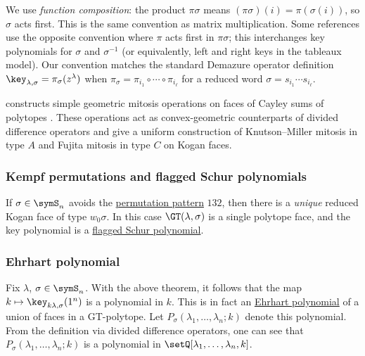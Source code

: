 \begin{remark}
We use \emph{function composition}: the product $\pi\sigma$ means
$(\pi\sigma)(i) = \pi(\sigma(i))$, so $\sigma$ acts first.
This is the same convention as matrix multiplication.
Some references use the opposite convention where $\pi$ acts first in $\pi\sigma$;
this interchanges key polynomials for $\sigma$ and $\sigma^{-1}$
(or equivalently, left and right keys in the tableaux model).
Our convention matches the standard Demazure operator definition
$\key_{\lambda,\sigma} = \pi_\sigma(z^\lambda)$
when $\pi_\sigma = \pi_{i_1} \circ \dotsb \circ \pi_{i_\ell}$
for a reduced word $\sigma = s_{i_1} \dotsm s_{i_\ell}$.
\end{remark}

 constructs simple geometric mitosis operations on
faces of Cayley sums of polytopes \cite{Kiritchenko2025}.  These operations
act as convex-geometric counterparts of divided difference operators and give
a uniform construction of Knutson--Miller mitosis in type $A$ and Fujita
mitosis in type $C$ on Kogan faces.


\subsubsection[keyKempf]{Kempf permutations and flagged Schur polynomials}

\begin{proposition}\label{prop:kempfCase}
If $\sigma \in \symS_n$ avoids the \hyperref[permutationPattern]{permutation pattern} $132$,
then there is a \emph{unique} reduced Kogan face of type $w_0 \sigma$.
In this case $\GT(\lambda, \sigma)$ is a single polytope face,
and the key polynomial is a \hyperref[schurFlagged]{flagged Schur polynomial}.
\end{proposition}


\subsubsection[keyEhrhart]{Ehrhart polynomial}

Fix $\lambda$, $\sigma \in \symS_n$.
With the above theorem, it follows that the map $k \mapsto \key_{k \lambda,\sigma}(1^n)$
is a polynomial in $k$.
This is in fact an \hyperref[ehrhart]{Ehrhart polynomial} of a union of faces
in a GT-polytope.
Let $P_{\sigma}(\lambda_1,\dotsc,\lambda_n;k)$ denote this polynomial.
From the definition via divided difference operators,
one can see that $P_{\sigma}(\lambda_1,\dotsc,\lambda_n;k)$
is a polynomial in $\setQ[\lambda_1,\dotsc,\lambda_n,k]$.

